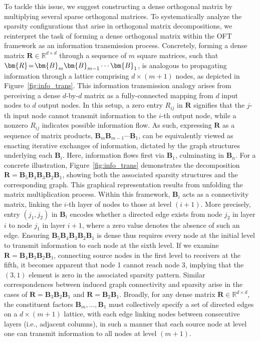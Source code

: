 To tackle this issue, we suggest constructing a dense orthogonal matrix by multiplying several sparse orthogonal matrices. To systematically analyze the sparsity configurations that arise in orthogonal matrix decompositions, we reinterpret the task of forming a dense orthogonal matrix within the OFT framework as an information transmission process. Concretely, forming a dense matrix $\bm{R}\in\mathbb{R}^{d\times d}$ through a sequence of $m$ square matrices, such that $\thickmuskip=2mu \medmuskip=2mu \bm{R}=\bm{B}_m\bm{B}_{m-1}\cdots\bm{B}_1$, is analogous to propagating information through a lattice comprising $d\times (m+1)$ nodes, as depicted in Figure~\ref{fig:info_trans}. This information transmission analogy arises from perceiving a dense $d$-by-$d$ matrix as a fully-connected mapping from $d$ input nodes to $d$ output nodes. In this setup, a zero entry $R_{ij}$ in $\bm{R}$ signifies that the $j$-th input node cannot transmit information to the $i$-th output node, while a nonzero $R_{ij}$ indicates possible information flow. As such, expressing $\bm{R}$ as a sequence of matrix products, $\bm{B}_m\bm{B}_{m-1}\cdots\bm{B}_1$, can be equivalently viewed as enacting iterative exchanges of information, dictated by the graph structures underlying each $\bm{B}_i$. Here, information flows first via $\bm{B}_1$, culminating in $\bm{B}_n$. For a concrete illustration, Figure~\ref{fig:info_trans} demonstrates the decomposition $\bm{R}=\bm{B}_5\bm{B}_4\bm{B}_3\bm{B}_2\bm{B}_1$, showing both the associated sparsity structures and the corresponding graph. This graphical representation results from unfolding the matrix multiplication process. Within this framework, $\bm{B}_i$ acts as a connectivity matrix, linking the $i$-th layer of nodes to those at level $(i+1)$. More precisely, entry $(j_1,j_2)$ in $\bm{B}_i$ encodes whether a directed edge exists from node $j_2$ in layer $i$ to node $j_1$ in layer $i+1$, where a zero value denotes the absence of such an edge. Ensuring $\bm{B}_5\bm{B}_4\bm{B}_3\bm{B}_2\bm{B}_1$ is dense thus requires every node at the initial level to transmit information to each node at the sixth level. If we examine $\bm{R}=\bm{B}_4\bm{B}_3\bm{B}_2\bm{B}_1$, connecting source nodes in the first level to receivers at the fifth, it becomes apparent that node 1 cannot reach node 3, implying that the $(3,1)$ element is zero in the associated sparsity pattern. Similar correspondences between induced graph connectivity and sparsity arise in the cases of $\bm{R}=\bm{B}_3\bm{B}_2\bm{B}_1$ and $\bm{R}=\bm{B}_2\bm{B}_1$. Broadly, for any dense matrix $\bm{R}\in\mathbb{R}^{d\times d}$, the constituent factors $\bm{B}_m,\ldots,\bm{B}_1$ must collectively specify a set of directed edges on a $d\times(m+1)$ lattice, with each edge linking nodes between consecutive layers (i.e., adjacent columns), in such a manner that each source node at level one can transmit information to all nodes at level $(m+1)$.

